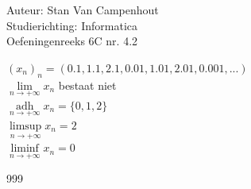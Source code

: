 \documentclass[a4paper]{article}
\begin{document}
  
\noindent \large Auteur: Stan Van Campenhout \\
\noindent \large Studierichting:  Informatica\\
\noindent \large Oefeningenreeks 6C nr. 4.2\\

\medskip

\normalsize

$ (x_n)_n = (0.1,1.1,2.1,0.01,1.01,2.01,0.001,...) $\\

$ \lim\limits_{n\rightarrow+\infty}x_n $ bestaat niet \\

$\displaystyle \mathop{\mathrm{adh}}\limits_{n \rightarrow +\infty} x_n = \{0,1,2\}$\\

$ \limsup\limits_{n\rightarrow+\infty} x_n = 2 $\\

$ \liminf\limits_{n\rightarrow+\infty} x_n = 0 $\\

\begin{thebibliography}{999}
\end{thebibliography}
\end{document}
